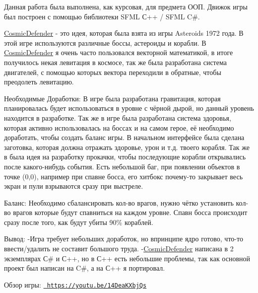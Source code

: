 Данная работа была выполнена, как курсовая, для предмета ООП. Движок игры был построен с помощью библиотеки SFML С++ / SFML C\#.

\mbox{\hyperlink{namespace_cosmic_defender}{Cosmic\+Defender}} -\/ это идея, которая была взята из игры Asteroids 1972 года. В этой игре используются различные боссы, астероиды и корабли. В \mbox{\hyperlink{namespace_cosmic_defender}{Cosmic\+Defender}} я очень часто пользовался векторной математикой, в итоге получилось некая левитация в космосе, так же была разработана система двигателей, с помощью которых вектора переходили в обратные, чтобы преодолеть левитацию.

Необходимые Доработки\+: В игре была разработана гравитация, которая планировалась будет использоваться в уровне с чёрной дырой, но данный уровень находится в разработке. Так же в игре была разработана система здоровья, которая активно использовалась на боссах и на самом герое, её необходимо доработать, чтобы создать баланс игры. В начальном интерфейсе была сделана заготовка, которая должна отражать здоровье, урон и т.\+д. твоего корабля. Так же в была идея на разработку прокачки, чтобы последующие корабли открывались после какого-\/нибудь события. Есть небольшой баг, при появлении объектов в точке (0,0), например при спавне босса, его хитбокс почему-\/то закрывает весь экран и пули взрываются сразу при выстреле.

Баланс\+: Необходимо сбалансировать кол-\/во врагов, нужно чётко установить кол-\/во врагов которые будут спавниться на каждом уровне. Спавн босса происходит сразу после того, как будут убиты 90\% кораблей.

Вывод\+: -\/Игра требует небольших доработок, но впринципе ядро готово, что-\/то ввести/удалить не составит большого труда. -\/\mbox{\hyperlink{namespace_cosmic_defender}{Cosmic\+Defender}} написана в 2 экземплярах С\# и С++, но в С++ есть небольшие проблемы, так как основной проект был написан на C\#, а на С++ я портировал.

Обзор игры\+: \href{https://youtu.be/14DeaKXbjQs}{\texttt{ https\+://youtu.\+be/14\+Dea\+KXbj\+Qs}} 
